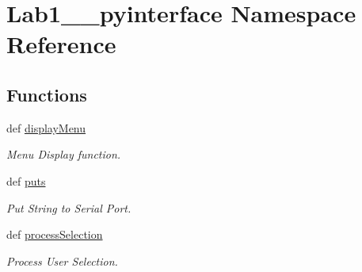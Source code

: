 \hypertarget{namespace_lab1__483__pyinterface}{\section{Lab1\-\_\-\_\-pyinterface Namespace Reference}
\label{namespace_lab1__483__pyinterface}
}
\subsection*{Functions}
\begin{DoxyCompactItemize}
\item 
def \hyperlink{namespace_lab1__483__pyinterface_a75a261f4a81e84215ecdc8a9cba9c2d6}{display\-Menu}
\begin{DoxyCompactList}\small\item\em Menu Display function. \end{DoxyCompactList}\item 
def \hyperlink{namespace_lab1__483__pyinterface_a673afbf98587b2487210cd7db0bcb2f5}{puts}
\begin{DoxyCompactList}\small\item\em Put String to Serial Port. \end{DoxyCompactList}\item 
def \hyperlink{namespace_lab1__483__pyinterface_acf1b33ef7c2c2a6e7950463bd28fa7de}{process\-Selection}
\begin{DoxyCompactList}\small\item\em Process User Selection. \end{DoxyCompactList}\end{DoxyCompactItemize}
